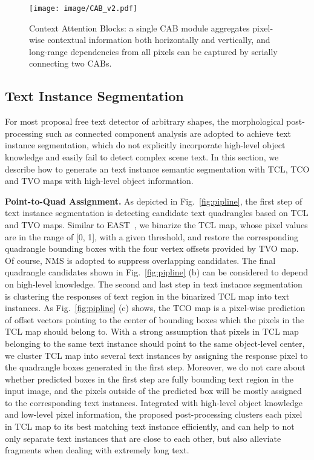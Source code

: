 \documentclass[sigconf]{acmart}
\begin{document}
\begin{figure}
  \texttt{[image: image/CAB\_v2.pdf]}
  \caption{ Context Attention Blocks: a single CAB module aggregates pixel-wise contextual information both horizontally and vertically, and long-range dependencies from all pixels can be captured by serially connecting two CABs.}
  \label{fig:cab_module}
\end{figure}




\subsection{Text Instance Segmentation}
For most proposal free text detector of arbitrary shapes, the morphological post-processing such as connected component analysis are adopted to achieve text instance segmentation, which do not explicitly incorporate high-level object knowledge and easily fail to detect complex scene text. In this section, we describe how to generate an text instance semantic segmentation with TCL, TCO and TVO maps with high-level object information.


\textbf{Point-to-Quad Assignment.}
As depicted in Fig.~\ref{fig:pipline}, the first step of text instance segmentation is detecting candidate text quadrangles based on TCL and TVO maps. 
Similar to EAST~\cite{zhou2017east}, we binarize the TCL map, whose pixel values are in the range of [0, 1], with a given threshold, and restore the corresponding quadrangle bounding boxes with the four vertex offsets provided by TVO map. Of course, NMS is adopted to suppress overlapping candidates.
The final quadrangle candidates shown in Fig.~\ref{fig:pipline} (b) can be considered to depend on high-level knowledge.
The second and last step in text instance segmentation is clustering the responses of text region in the binarized TCL map into text instances.
As Fig.~\ref{fig:pipline} (c) shows, the TCO map is a pixel-wise prediction of offset vectors pointing to the center of bounding boxes which the pixels in the TCL map should belong to. 
With a strong assumption that pixels in TCL map belonging to the same text instance should point to the same object-level center, we cluster TCL map into several text instances by assigning the response pixel to the quadrangle boxes generated in the first step.
Moreover, we do not care about whether predicted boxes in the first step are fully bounding text region in the input image, and the pixels outside of the predicted box will be mostly assigned to the corresponding text instances.
Integrated with high-level object knowledge and low-level pixel information, the proposed post-processing clusters each pixel in TCL map to its best matching text instance efficiently, and can help to not only separate text instances that are close to each other, but also alleviate fragments when dealing with extremely long text.
\end{document}
